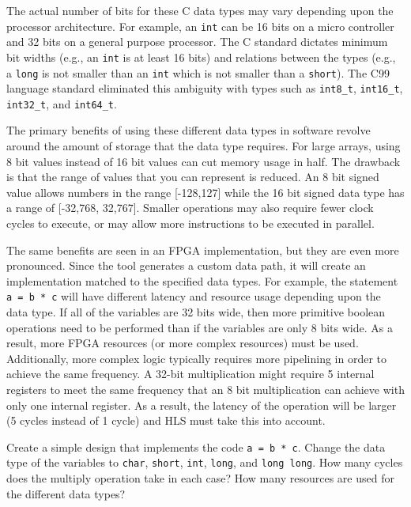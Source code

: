 The actual number of bits for these C data types may vary depending upon the processor architecture. For example, an \lstinline{int} can be 16 bits on a micro controller and 32 bits on a general purpose processor. The C standard dictates minimum bit widths (e.g., an \lstinline{int} is at least 16 bits) and relations between the types (e.g., a \lstinline{long} is not smaller than an \lstinline{int} which is not smaller than a \lstinline{short}).  The C99 language standard eliminated this ambiguity with types such as \lstinline{int8_t}, \lstinline{int16_t}, \lstinline{int32_t}, and \lstinline{int64_t}.  

The primary benefits of using these different data types in software revolve around the amount of storage that the data type requires. For large arrays, using 8 bit values instead of 16 bit values can cut memory usage in half. The drawback is that the range of values that you can represent is reduced. An 8 bit signed value allows numbers in the range [-128,127] while the 16 bit signed data type has a range of [-32,768, 32,767].  Smaller operations may also require fewer clock cycles to execute, or may allow more instructions to be executed in parallel.

The same benefits are seen in an FPGA implementation, but they are even more pronounced. Since the \VHLS tool generates a custom data path, it will create an implementation matched to the specified data types. For example, the statement \lstinline{a = b * c} will have different latency and resource usage depending upon the data type. If all of the variables are 32 bits wide, then more primitive boolean operations need to be performed than if the variables are only 8 bits wide.   As a result, more FPGA resources (or more complex resources) must be used.  Additionally, more complex logic typically requires more pipelining in order to achieve the same frequency.  A 32-bit multiplication might require 5 internal registers to meet the same frequency that an 8 bit multiplication can achieve with only one internal register. As a result, the latency of the operation will be larger (5 cycles instead of 1 cycle) and HLS must take this into account.

\begin{exercise}
Create a simple design that implements the code \lstinline{a = b * c}. Change the data type of the variables to \lstinline{char}, \lstinline{short}, \lstinline{int}, \lstinline{long}, and \lstinline{long long}. How many cycles does the multiply operation take in each case? How many resources are used for the different data types?
\end{exercise}


